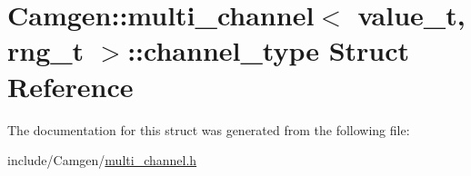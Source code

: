 \hypertarget{a00061}{}\section{Camgen\+:\+:multi\+\_\+channel$<$ value\+\_\+t, rng\+\_\+t $>$\+:\+:channel\+\_\+type Struct Reference}
\label{a00061}


The documentation for this struct was generated from the following file\+:\begin{DoxyCompactItemize}
\item 
include/\+Camgen/\hyperlink{a00698}{multi\+\_\+channel.\+h}\end{DoxyCompactItemize}
